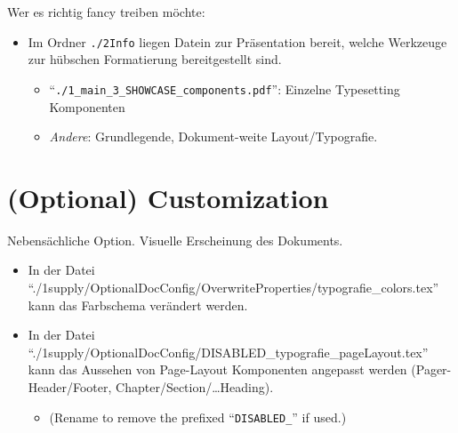 Wer es richtig fancy treiben möchte:
\begin{itemize}[labpragA]
    \item Im Ordner \texttt{./\textcolor{RedOrange}{2Info}} liegen Datein zur Präsentation bereit, welche Werkzeuge zur hübschen Formatierung bereitgestellt sind.
        \begin{itemize}
            \item \enquote{\textcolor{PineGreen}{\texttt{./1\_main\_3\_SHOWCASE\_components.pdf}}}: Einzelne Typesetting Komponenten
            \item \textit{Andere}: Grundlegende, Dokument-weite Layout/Typografie.
        \end{itemize}
\end{itemize}




\section*{(Optional) Customization}
\noindent
Nebensächliche Option. Visuelle Erscheinung des Dokuments.
\begin{itemize}
	\item In der Datei \enquote{\textcolor{PineGreen}{./1supply/OptionalDocConfig/OverwriteProperties/typografie\_colors.tex}} kann das Farbschema verändert werden.
	\item In der Datei \enquote{\textcolor{PineGreen}{./1supply/OptionalDocConfig/DISABLED\_typografie\_pageLayout.tex}} kann das Aussehen von Page-Layout Komponenten angepasst werden (Pager-Header/Footer, Chapter/Section/\ldots Heading).
	\begin{itemize}
		\item (Rename to remove the prefixed \enquote{\texttt{DISABLED\_}} if used.)
	\end{itemize}
\end{itemize}



